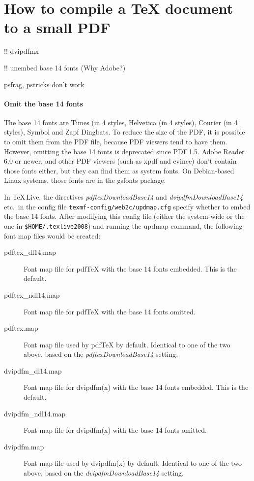 \documentclass{ltugproc}
\def\cmd{\textsf}
\def\pkg{\textsf}
\begin{document}
\section{How to compile a \TeX{} document to a small PDF}

!! dvipdfmx

!! unembed base 14 fonts (Why Adobe?)


psfrag, pstricks don't work

\paragraph{Omit the base 14 fonts} The base 14 fonts are Times (in 4 styles,
Helvetica (in 4 styles), Courier (in 4 styles), Symbol and Zapf Dingbats.
To reduce the size of the PDF, it is possible to omit them from the
PDF file, because PDF viewers tend to have them. However, omitting the base 14
fonts is deprecated since PDF\,1.5. Adobe Reader 6.0 or newer,
and other PDF viewers (such as \cmd{xpdf} and \cmd{evince}) don't contain
those fonts either, but they can find them as system fonts. On Debian-based
Linux systems, those fonts are in the \pkg{gsfonts} package.

In \TeX\,Live, the directives \emph{pdftexDownloadBase14} and
\emph{dvipdfmDownloadBase14} etc.\ in the config file
\texttt{texmf-config/web2c/updmap.cfg} specify whether to embed the base 14
fonts. After modifying this config file (either the system-wide or the one in
\texttt{\$HOME/.texlive2008}) and running the \cmd{updmap} command, the
following font map files would be created:

\begin{description}

\item[pdftex\_dl14.map] Font map file for pdf\TeX{} with the base 14 fonts
  embedded. This is the default.
\item[pdftex\_ndl14.map] Font map file for pdf\TeX{} with the base 14 fonts
  omitted.
\item[pdftex.map] Font map file used by pdf\TeX{} by default.
Identical to one of the two above, based on the
\emph{pdftexDownloadBase14} setting.
\item[dvipdfm\_dl14.map] Font map file for \cmd{dvipdfm(x)} with the base 14
  fonts embedded. This is the default.
\item[dvipdfm\_ndl14.map] Font map file for \cmd{dvipdfm(x)} with the base 14
  fonts omitted.
\item[dvipdfm.map] Font map file used by \cmd{dvipdfm(x)} by default.
Identical to one of the two above, based on the
\emph{dvipdfmDownloadBase14} setting.

\end{description}
\end{document}
